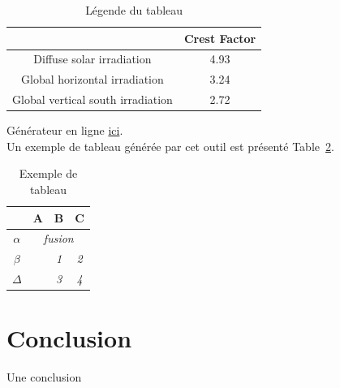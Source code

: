 \begin{table}[]
	\centering
	\begin{tabular}{c|c|}
		\cline{2-2}
		& Crest Factor \\ \hline
		\multicolumn{1}{|c|}{Diffuse solar irradiation}              & 4.93         \\ \hline
		\multicolumn{1}{|c|}{Global horizontal irradiation}          & 3.24         \\ \hline
		\multicolumn{1}{|c|}{Global vertical south irradiation} & 2.72         \\ \hline
	\end{tabular}
	\caption{Légende du tableau}
	\label{Ch2:tab:crest_solar}
\end{table}

Générateur en ligne \href{http://www.tablesgenerator.com/latex_tables}{ici}. \\

Un exemple de tableau générée par cet outil est présenté Table~\ref{Ch1:tab:exemple}.

\begin{table}[]
	\centering
	\begin{tabular}{c|c|c|c|}
		\cline{2-4}
		& \textbf{A}                 & \textbf{B} & \textbf{C} \\ \hline
		\multicolumn{1}{|c|}{$\alpha$} & \multicolumn{3}{c|}{\textit{fusion}}                 \\ \hline
		\multicolumn{1}{|c|}{$\beta$}  & \multirow{2}{*}{\textit{}} & \textit{1} & \textit{2} \\ \cline{1-1} \cline{3-4} 
		\multicolumn{1}{|c|}{$\Delta$} &                            & \textit{3} & \textit{4} \\ \hline
	\end{tabular}
	\caption{Exemple de tableau}
	\label{Ch1:tab:exemple}
\end{table}

\section{Conclusion}

Une conclusion
